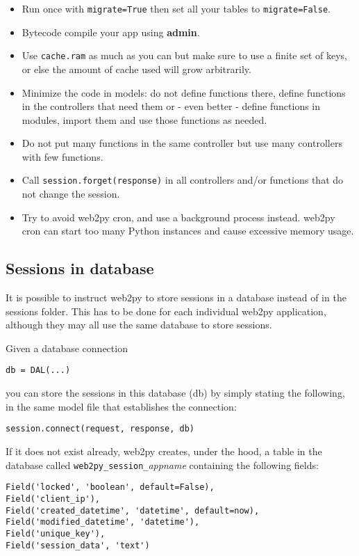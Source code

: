 \documentclass[justified,sixbynine,notoc]{tufte-book}
\def\ft{\small\tt}
\begin{document}
\begin{fullwidth}
\begin{itemize}
\item Run once with {\ft migrate=True} then set all your tables to {\ft migrate=False}.

\item Bytecode compile your app using {\bf admin}.

\item Use {\ft cache.ram} as much as you can but make sure to use a finite set of keys, or else the amount of cache used will grow arbitrarily.

\item Minimize the code in models: do not define functions there, define functions in the controllers that need them or - even better - define functions in modules, import them and use those functions as needed.

\item Do not put many functions in the same controller but use many controllers with few functions.

\item Call {\ft session.forget(response)} in all controllers and/or functions that do not change the session.

\item Try to avoid web2py cron, and use a background process instead. web2py cron can start too many Python instances and cause excessive memory usage.
\end{itemize}

\goodbreak\subsection{Sessions in database}

It is possible to instruct web2py to store sessions in a database instead of in the sessions folder. This has to be done for each individual web2py application, although they may all use the same database to store sessions.

Given a database connection
\begin{lstlisting}
db = DAL(...)
\end{lstlisting}
\noindent you can store the sessions in this database (db) by simply stating the following, in the same model file that establishes the connection:
\begin{lstlisting}
session.connect(request, response, db)
\end{lstlisting}

If it does not exist already, web2py creates, under the hood, a table in the database called {\ft web2py\_session\_}{\it appname} containing the following fields:
\begin{lstlisting}
Field('locked', 'boolean', default=False),
Field('client_ip'),
Field('created_datetime', 'datetime', default=now),
Field('modified_datetime', 'datetime'),
Field('unique_key'),
Field('session_data', 'text')
\end{lstlisting}


\end{fullwidth}
\end{document}
